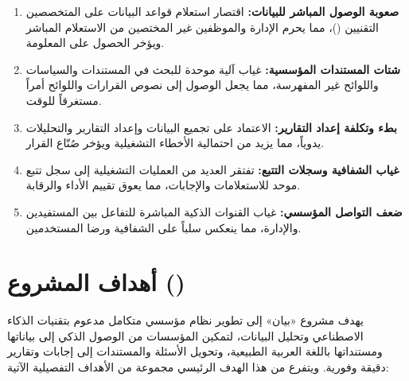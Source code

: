 \begin{enumerate}
  \item \textbf{صعوبة الوصول المباشر للبيانات:} اقتصار استعلام قواعد البيانات
        على المتخصصين التقنيين ()، مما يحرم الإدارة والموظفين غير
        المختصين من الاستعلام المباشر ويؤخر الحصول على المعلومة.
  \item \textbf{شتات المستندات المؤسسية:} غياب آلية موحدة للبحث في المستندات
        والسياسات واللوائح غير المفهرسة، مما يجعل الوصول إلى نصوص القرارات
        واللوائح أمراً مستغرقاً للوقت.
  \item \textbf{بطء وتكلفة إعداد التقارير:} الاعتماد على تجميع البيانات
        وإعداد التقارير والتحليلات يدوياً، مما يزيد من احتمالية الأخطاء
        التشغيلية ويؤخر صُنّاع القرار.
  \item \textbf{غياب الشفافية وسجلات التتبع:} تفتقر العديد من العمليات
        التشغيلية إلى سجل تتبع موحد للاستعلامات والإجابات، مما يعوق تقييم
        الأداء والرقابة.
  \item \textbf{ضعف التواصل المؤسسي:} غياب القنوات الذكية المباشرة للتفاعل
        بين المستفيدين والإدارة، مما ينعكس سلباً على الشفافية ورضا المستخدمين.
\end{enumerate}

\section{أهداف المشروع ()}
\label{sec:objectives}

يهدف مشروع «بيان» إلى تطوير نظام مؤسسي متكامل مدعوم بتقنيات الذكاء الاصطناعي
وتحليل البيانات، لتمكين المؤسسات من الوصول الذكي إلى بياناتها ومستنداتها
باللغة العربية الطبيعية، وتحويل الأسئلة والمستندات إلى إجابات وتقارير دقيقة
وفورية. ويتفرع من هذا الهدف الرئيسي مجموعة من الأهداف التفصيلية الآتية:

